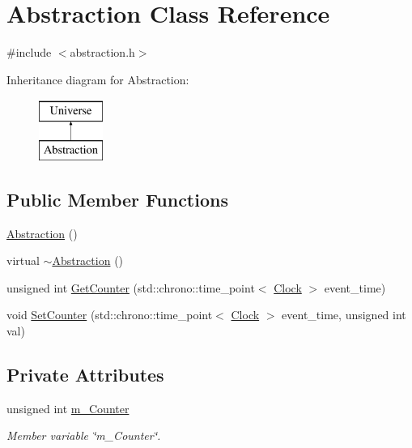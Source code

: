 \hypertarget{classAbstraction}{}\section{Abstraction Class Reference}
\label{classAbstraction}


{\ttfamily \#include $<$abstraction.\+h$>$}

Inheritance diagram for Abstraction\+:\begin{figure}[H]
\begin{center}
\leavevmode
\includegraphics[height=2.000000cm]{classAbstraction}
\end{center}
\end{figure}
\subsection*{Public Member Functions}
\begin{DoxyCompactItemize}
\item 
\mbox{\hyperlink{classAbstraction_af4bf8b0e2bfd07d50ffc28b98f35b2ee}{Abstraction}} ()
\item 
virtual \mbox{\hyperlink{classAbstraction_aaf7d34417ea08792cc2b9449f9bfdc8e}{$\sim$\+Abstraction}} ()
\item 
unsigned int \mbox{\hyperlink{classAbstraction_a2b5e781d95a843a67db307b431f419a7}{Get\+Counter}} (std\+::chrono\+::time\+\_\+point$<$ \mbox{\hyperlink{universe_8h_a0ef8d951d1ca5ab3cfaf7ab4c7a6fd80}{Clock}} $>$ event\+\_\+time)
\item 
void \mbox{\hyperlink{classAbstraction_a82cd32bf3de41f35ab76d80611fe6763}{Set\+Counter}} (std\+::chrono\+::time\+\_\+point$<$ \mbox{\hyperlink{universe_8h_a0ef8d951d1ca5ab3cfaf7ab4c7a6fd80}{Clock}} $>$ event\+\_\+time, unsigned int val)
\end{DoxyCompactItemize}
\subsection*{Private Attributes}
\begin{DoxyCompactItemize}
\item 
unsigned int \mbox{\hyperlink{classAbstraction_a6144b0e382f72ad170a238d6ed4a0486}{m\+\_\+\+Counter}}
\begin{DoxyCompactList}\small\item\em Member variable \char`\"{}m\+\_\+\+Counter\char`\"{}. \end{DoxyCompactList}\end{DoxyCompactItemize}
